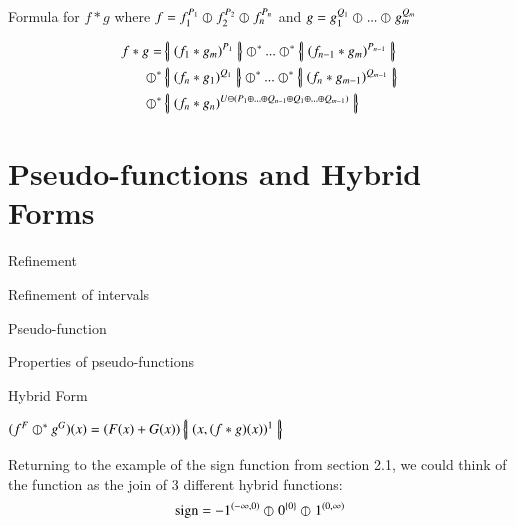 Formula for $f*g$ where $f = f_1^{P_1} \hjoin f_2^{P_2} \hjoin f_n^{P_n}$ and $g = g_1^{Q_1} \hjoin ... \hjoin g_m^{Q_m}$

\begin{align*}
f*g = & \hset{ (f_1 * g_m)^{P_1} } \hjoin[*] ... \hjoin[*] \hset{ (f_{n-1} * g_m)^{P_{n-1}}} \\ \hjoin[*]
& \hset{ (f_n * g_1)^{Q_1} } \hjoin[*] ... \hjoin[*] \hset{ (f_n * g_{m-1})^{Q_{m-1}}} \\ \hjoin[*]
&\hset{ (f_n * g_n)^{U \ominus (P_1 \oplus ... \oplus Q_{n-1} \oplus Q_1 \oplus ... \oplus Q_{m-1})}}
\end{align*}




\newpage














\section{Pseudo-functions and Hybrid Forms}
\begin{definition}
Refinement
\end{definition}

\begin{example}
Refinement of intervals
\end{example}

\begin{definition}
Pseudo-function
\end{definition}

Properties of pseudo-functions

\begin{definition}
Hybrid Form
\end{definition}

\begin{definition}
$(f^F \hjoin[*] g^G)(x) = (F(x) + G(x)) \hset{(x, (f*g)(x))^1}$
\end{definition}

Returning to the example of the sign function from section 2.1, we could think of the function as the join of 3 different hybrid functions:
\begin{equation}
\text{sign} = -1^{(-\infty, 0)} \hjoin 0^{\{0\}} \hjoin 1^{(0, \infty)}
\end{equation}

